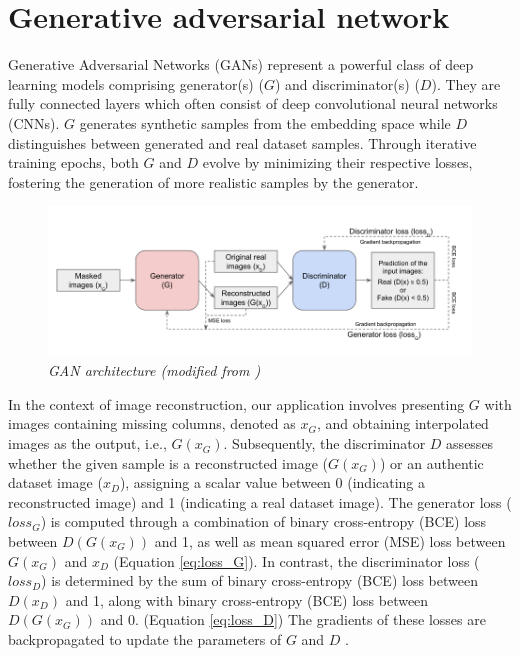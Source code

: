 \section{Generative adversarial network}
Generative Adversarial Networks (GANs) represent a powerful class of deep learning models comprising generator(s) ($G$) and discriminator(s) ($D$). They are fully connected layers which often consist of deep convolutional neural networks (CNNs). \cite{siahkoohi2018seismic} $G$ generates synthetic samples from the embedding space while $D$ distinguishes between generated and real dataset samples. Through iterative training epochs, both $G$ and $D$ evolve by minimizing their respective losses, fostering the generation of more realistic samples by the generator.

\begin{figure}[H]
    \centering
    \includegraphics[width=\textwidth]{Figure/Front_page/flow chart.png}
    \caption{\textit{GAN architecture (modified from \cite{saxena2021generative})}}
    \label{fig:archi}
\end{figure}

\noindent In the context of image reconstruction, our application involves presenting $G$ with images containing missing columns, denoted as $x_{G}$, and obtaining interpolated images as the output, i.e., $G(x_{G})$. Subsequently, the discriminator $D$ assesses whether the given sample is a reconstructed image ($G(x_{G})$) or an authentic dataset image ($x_{D}$), assigning a scalar value between 0 (indicating a reconstructed image) and 1 (indicating a real dataset image). The generator loss ($loss_{G}$) is computed through a combination of binary cross-entropy (BCE) loss between $D(G(x_{G}))$ and 1, as well as mean squared error (MSE) loss between $G(x_{G})$ and $x_{D}$ (Equation \ref{eq:loss_G}). In contrast, the discriminator loss ($loss_{D}$) is determined by the sum of binary cross-entropy (BCE) loss between $D(x_{D})$ and 1, along with binary cross-entropy (BCE) loss between $D(G(x_{G}))$ and 0. (Equation 
 \ref{eq:loss_D}) The gradients of these losses are backpropagated to update the parameters of $G$ and $D$ \cite{saxena2021generative}.

